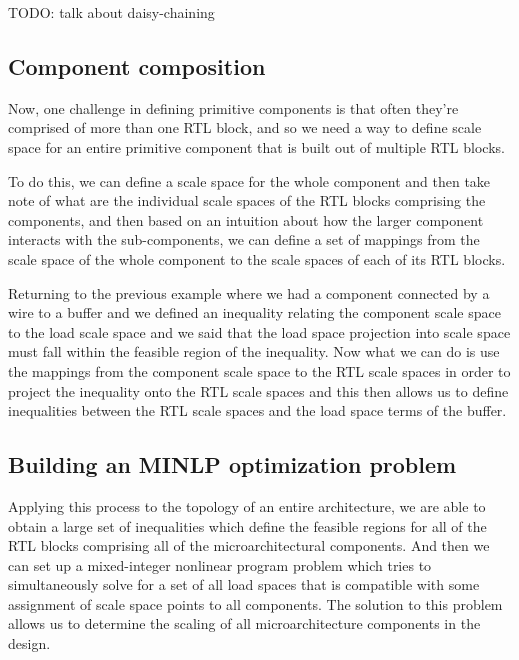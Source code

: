 TODO: talk about daisy-chaining

\subsection{Component composition}

Now, one challenge in defining primitive components is that often they're comprised of more than one RTL block, and so we need a way to define scale space for an entire primitive component that is built out of multiple RTL blocks.

To do this, we can define a scale space for the whole component and then take note of what are the individual scale spaces of the RTL blocks comprising the components, and then based on an intuition about how the larger component interacts with the sub-components, we can define a set of mappings from the scale space of the whole component to the scale spaces of each of its RTL blocks.

Returning to the previous example where we had a component connected by a wire to a buffer and we defined an inequality relating the component scale space to the load scale space and we said that the load space projection into scale space must fall within the feasible region of the inequality. Now what we can do is use the mappings from the component scale space to the RTL scale spaces in order to project the inequality onto the RTL scale spaces and this then allows us to define inequalities between the RTL scale spaces and the load space terms of the buffer.

\subsection{Building an MINLP optimization problem}

Applying this process to the topology of an entire architecture, we are able to obtain a large set of inequalities which define the feasible regions for all of the RTL blocks comprising all of the microarchitectural components. And then we can set up a mixed-integer nonlinear program problem which tries to simultaneously solve for a set of all load spaces that is compatible with some assignment of scale space points to all components. The solution to this problem allows us to determine the scaling of all microarchitecture components in the design.